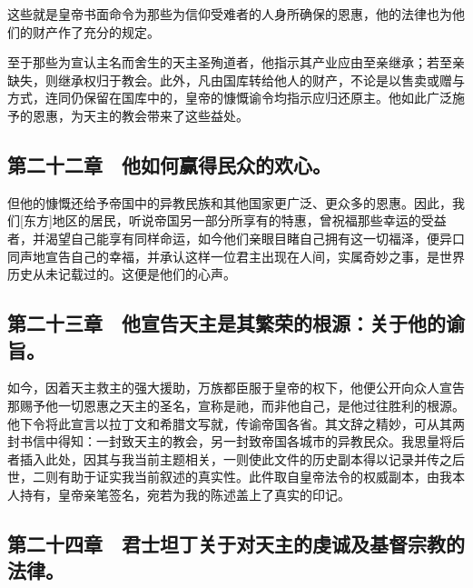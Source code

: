 这些就是皇帝书面命令为那些为信仰受难者的人身所确保的恩惠，他的法律也为他们的财产作了充分的规定。\par

至于那些为宣认主名而舍生的天主圣殉道者，他指示其产业应由至亲继承；若至亲缺失，则继承权归于教会。此外，凡由国库转给他人的财产，不论是以售卖或赠与方式，连同仍保留在国库中的，皇帝的慷慨谕令均指示应归还原主。他如此广泛施予的恩惠，为天主的教会带来了这些益处。\par


\subsection{第二十二章　他如何赢得民众的欢心。}

但他的慷慨还给予帝国中的异教民族和其他国家更广泛、更众多的恩惠。因此，我们[东方]地区的居民，听说帝国另一部分所享有的特惠，曾祝福那些幸运的受益者，并渴望自己能享有同样命运，如今他们亲眼目睹自己拥有这一切福泽，便异口同声地宣告自己的幸福，并承认这样一位君主出现在人间，实属奇妙之事，是世界历史从未记载过的。这便是他们的心声。\par


\subsection{第二十三章　他宣告天主是其繁荣的根源：关于他的谕旨。}

如今，因着天主救主的强大援助，万族都臣服于皇帝的权下，他便公开向众人宣告那赐予他一切恩惠之天主的圣名，宣称是祂，而非他自己，是他过往胜利的根源。他下令将此宣言以拉丁文和希腊文写就，传谕帝国各省。其文辞之精妙，可从其两封书信中得知：一封致天主的教会，另一封致帝国各城市的异教民众。我思量将后者插入此处，因其与我当前主题相关，一则使此文件的历史副本得以记录并传之后世，二则有助于证实我当前叙述的真实性。此件取自皇帝法令的权威副本，由我本人持有，皇帝亲笔签名，宛若为我的陈述盖上了真实的印记。\par


\subsection{第二十四章　君士坦丁关于对天主的虔诚及基督宗教的法律。}

